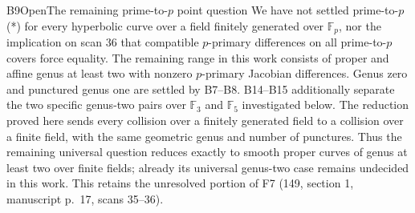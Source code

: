 \begin{result}{B9}{Open}{The remaining prime-to-$p$ point question}
\label{res:B9}
We have not settled prime-to-$p$ (*) for every hyperbolic curve over
a field finitely generated over $\mathbb F_p$, nor the implication
on scan 36 that compatible $p$-primary differences on all
prime-to-$p$ covers force equality. The remaining range in this work
consists of proper and affine genus at least two with
nonzero $p$-primary Jacobian differences. Genus zero and punctured
genus one are settled by B7--B8. B14--B15 additionally separate the
two specific genus-two pairs over $\mathbb F_3$ and $\mathbb F_5$
investigated below. The reduction proved here sends every collision
over a finitely generated field to a collision over a finite field,
with the same geometric genus and number of punctures. Thus the
remaining universal question reduces exactly to smooth proper curves
of genus at least two over finite fields; already its universal
genus-two case remains undecided in this work.
This retains the unresolved portion
of F7 (149, section 1, manuscript p.~17, scans 35--36).
\end{result}
